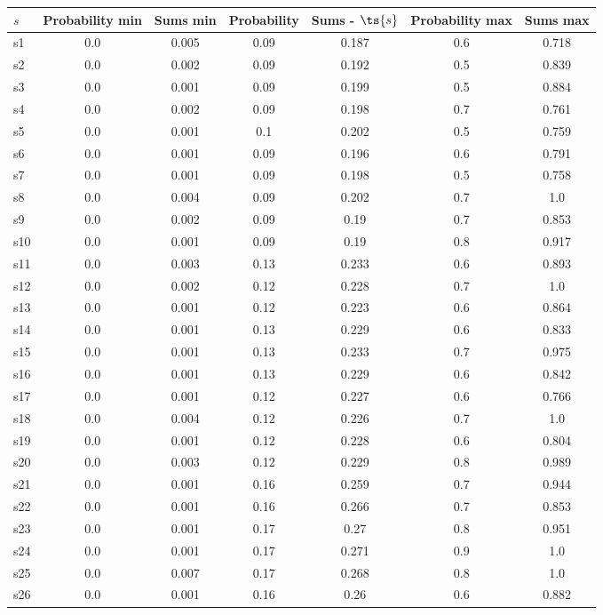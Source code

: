 \documentclass{article}
\begin{document}
\noindent\begin{tabular}{|l|c|c|c|c|c|c|}
\hline
$s$& Probability min & Sums min & Probability & Sums - $\ts{s}$ & Probability max & Sums max\\
\hline
s1 &0.0 & 0.005 & 0.09 & 0.187 & 0.6 & 0.718\\
\hline
s2 &0.0 & 0.002 & 0.09 & 0.192 & 0.5 & 0.839\\
\hline
s3 &0.0 & 0.001 & 0.09 & 0.199 & 0.5 & 0.884\\
\hline
s4 &0.0 & 0.002 & 0.09 & 0.198 & 0.7 & 0.761\\
\hline
s5 &0.0 & 0.001 & 0.1 & 0.202 & 0.5 & 0.759\\
\hline
s6 &0.0 & 0.001 & 0.09 & 0.196 & 0.6 & 0.791\\
\hline
s7 &0.0 & 0.001 & 0.09 & 0.198 & 0.5 & 0.758\\
\hline
s8 &0.0 & 0.004 & 0.09 & 0.202 & 0.7 & 1.0\\
\hline
s9 &0.0 & 0.002 & 0.09 & 0.19 & 0.7 & 0.853\\
\hline
s10 &0.0 & 0.001 & 0.09 & 0.19 & 0.8 & 0.917\\
\hline
s11 &0.0 & 0.003 & 0.13 & 0.233 & 0.6 & 0.893\\
\hline
s12 &0.0 & 0.002 & 0.12 & 0.228 & 0.7 & 1.0\\
\hline
s13 &0.0 & 0.001 & 0.12 & 0.223 & 0.6 & 0.864\\
\hline
s14 &0.0 & 0.001 & 0.13 & 0.229 & 0.6 & 0.833\\
\hline
s15 &0.0 & 0.001 & 0.13 & 0.233 & 0.7 & 0.975\\
\hline
s16 &0.0 & 0.001 & 0.13 & 0.229 & 0.6 & 0.842\\
\hline
s17 &0.0 & 0.001 & 0.12 & 0.227 & 0.6 & 0.766\\
\hline
s18 &0.0 & 0.004 & 0.12 & 0.226 & 0.7 & 1.0\\
\hline
s19 &0.0 & 0.001 & 0.12 & 0.228 & 0.6 & 0.804\\
\hline
s20 &0.0 & 0.003 & 0.12 & 0.229 & 0.8 & 0.989\\
\hline
s21 &0.0 & 0.001 & 0.16 & 0.259 & 0.7 & 0.944\\
\hline
s22 &0.0 & 0.001 & 0.16 & 0.266 & 0.7 & 0.853\\
\hline
s23 &0.0 & 0.001 & 0.17 & 0.27 & 0.8 & 0.951\\
\hline
s24 &0.0 & 0.001 & 0.17 & 0.271 & 0.9 & 1.0\\
\hline
s25 &0.0 & 0.007 & 0.17 & 0.268 & 0.8 & 1.0\\
\hline
s26 &0.0 & 0.001 & 0.16 & 0.26 & 0.6 & 0.882\\

\end{tabular}
\end{document}
